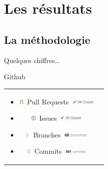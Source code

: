 \documentclass{beamer}
\begin{document}
\section{Les résultats} %
\subsection{La méthodologie}
\begin{frame}{Quelques chiffres\ldots}
	\begin{block}{Github}
		\begin{tabular}{cc}
			\hspace{-20px}
			\begin{minipage}{0.56\textwidth}
				\begin{itemize}
					\item \includegraphics[height=10px]{images/labels/pullRequestGreen.JPG}~Pull Requests~\includegraphics[height=10px]{images/stats/pullrequest.png}
					\item \includegraphics[height=10px]{images/labels/issues.JPG}~Issues~\includegraphics[height=10px]{images/stats/issues.png}
				\end{itemize}
			\end{minipage}
			\hspace{-15px}
			\begin{minipage}{0.5\textwidth}
				\begin{itemize}
					\item \includegraphics[height=10px]{images/labels/branches.JPG}~Branches~\includegraphics[height=10px]{images/stats/branches.png}
					\item \includegraphics[height=10px]{images/labels/commits.JPG}~Commits~\includegraphics[height=10px]{images/stats/commits.png}

\end{itemize}
\end{minipage}
\end{tabular}
\end{block}
\end{frame}
\end{document}
